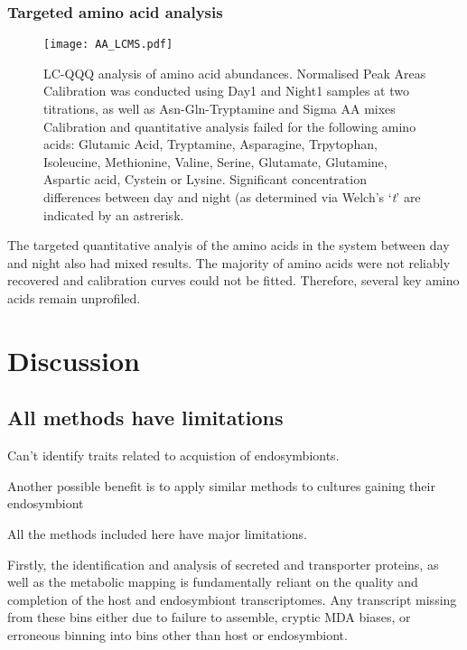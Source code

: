 \subsubsection{Targeted amino acid analysis}

\begin{figure}
    \texttt{[image: AA\_LCMS.pdf]}
    \caption[LCQQQ Quantitative Analysis of Amino Acids]{LC-QQQ analysis
        of amino acid abundances. Normalised Peak Areas 
        Calibration was conducted using Day1 and Night1 samples at two titrations, as well as Asn-Gln-Tryptamine and Sigma AA mixes
    Calibration and quantitative analysis failed for the following amino acids: 
Glutamic Acid, Tryptamine, Asparagine, Trpytophan, Isoleucine, Methionine, Valine, Serine, Glutamate, Glutamine, Aspartic acid, Cystein or Lysine.
Significant concentration differences between day and night (as determined via Welch's `\textit{t}' are indicated by an astrerisk.}
    \label{fig:amino_acids}
\end{figure}

The targeted quantitative analyis of the amino acids in the system
between day and night also had mixed results.  The majority of amino
acids were not reliably recovered and calibration curves could not be fitted.
Therefore, several key amino acids remain unprofiled.


\section{Discussion}

\subsection{All methods have limitations}

Can't identify traits related to acquistion of endosymbionts.

Another possible benefit is to apply similar methods to cultures gaining
their endosymbiont




All the methods included here have major limitations.


Firstly, the identification and analysis of secreted and transporter proteins,
as well as the metabolic mapping is fundamentally reliant on the quality and completion
of the host and endosymbiont transcriptomes. 
Any transcript missing from these bins either due to failure to assemble, 
cryptic MDA biases, or erroneous binning into bins other than host or endosymbiont.


